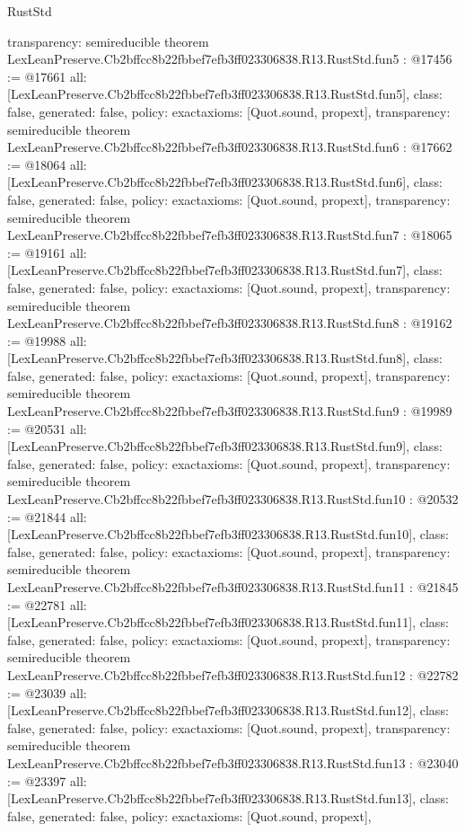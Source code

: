 \begin{lexlean}{RustStd}
\begin{coremodule}
{  transparency: semireducible
}
theorem LexLeanPreserve.Cb2bffcc8b22fbbef7efb3ff023306838.R13.RustStd.fun5 : @17456 := @17661 {
  all: [LexLeanPreserve.Cb2bffcc8b22fbbef7efb3ff023306838.R13.RustStd.fun5],
  class: false,
  generated: false,
  policy: exact{axioms: [Quot.sound, propext]},
  transparency: semireducible
}
theorem LexLeanPreserve.Cb2bffcc8b22fbbef7efb3ff023306838.R13.RustStd.fun6 : @17662 := @18064 {
  all: [LexLeanPreserve.Cb2bffcc8b22fbbef7efb3ff023306838.R13.RustStd.fun6],
  class: false,
  generated: false,
  policy: exact{axioms: [Quot.sound, propext]},
  transparency: semireducible
}
theorem LexLeanPreserve.Cb2bffcc8b22fbbef7efb3ff023306838.R13.RustStd.fun7 : @18065 := @19161 {
  all: [LexLeanPreserve.Cb2bffcc8b22fbbef7efb3ff023306838.R13.RustStd.fun7],
  class: false,
  generated: false,
  policy: exact{axioms: [Quot.sound, propext]},
  transparency: semireducible
}
theorem LexLeanPreserve.Cb2bffcc8b22fbbef7efb3ff023306838.R13.RustStd.fun8 : @19162 := @19988 {
  all: [LexLeanPreserve.Cb2bffcc8b22fbbef7efb3ff023306838.R13.RustStd.fun8],
  class: false,
  generated: false,
  policy: exact{axioms: [Quot.sound, propext]},
  transparency: semireducible
}
theorem LexLeanPreserve.Cb2bffcc8b22fbbef7efb3ff023306838.R13.RustStd.fun9 : @19989 := @20531 {
  all: [LexLeanPreserve.Cb2bffcc8b22fbbef7efb3ff023306838.R13.RustStd.fun9],
  class: false,
  generated: false,
  policy: exact{axioms: [Quot.sound, propext]},
  transparency: semireducible
}
theorem LexLeanPreserve.Cb2bffcc8b22fbbef7efb3ff023306838.R13.RustStd.fun10 : @20532 := @21844 {
  all: [LexLeanPreserve.Cb2bffcc8b22fbbef7efb3ff023306838.R13.RustStd.fun10],
  class: false,
  generated: false,
  policy: exact{axioms: [Quot.sound, propext]},
  transparency: semireducible
}
theorem LexLeanPreserve.Cb2bffcc8b22fbbef7efb3ff023306838.R13.RustStd.fun11 : @21845 := @22781 {
  all: [LexLeanPreserve.Cb2bffcc8b22fbbef7efb3ff023306838.R13.RustStd.fun11],
  class: false,
  generated: false,
  policy: exact{axioms: [Quot.sound, propext]},
  transparency: semireducible
}
theorem LexLeanPreserve.Cb2bffcc8b22fbbef7efb3ff023306838.R13.RustStd.fun12 : @22782 := @23039 {
  all: [LexLeanPreserve.Cb2bffcc8b22fbbef7efb3ff023306838.R13.RustStd.fun12],
  class: false,
  generated: false,
  policy: exact{axioms: [Quot.sound, propext]},
  transparency: semireducible
}
theorem LexLeanPreserve.Cb2bffcc8b22fbbef7efb3ff023306838.R13.RustStd.fun13 : @23040 := @23397 {
  all: [LexLeanPreserve.Cb2bffcc8b22fbbef7efb3ff023306838.R13.RustStd.fun13],
  class: false,
  generated: false,
  policy: exact{axioms: [Quot.sound, propext]},
}
\end{coremodule}
\end{lexlean}
